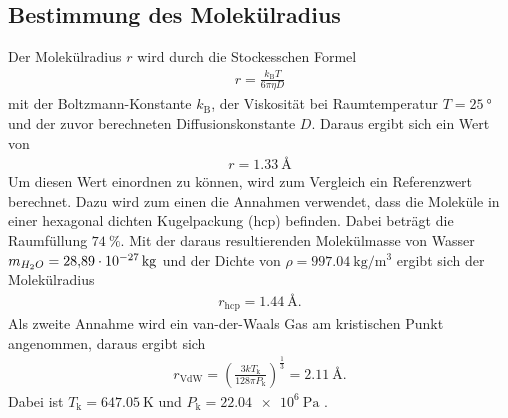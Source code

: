 \subsection{Bestimmung des Molekülradius}
\label{sec:AuswMolekuel}
Der Molekülradius $r$ wird durch die Stockesschen Formel
\begin{align*}
  r = \frac{k_\text{B} T}{6\pi\eta D}
\end{align*}
mit der Boltzmann-Konstante $k_\text{B}$, der Viskosität bei Raumtemperatur $T = \SI{25}{\degree}$
und der zuvor berechneten Diffusionskonstante $D$. Daraus ergibt sich ein Wert von
\begin{align*}
  r = \SI{1.33}{\angstrom}
\end{align*}
Um diesen Wert einordnen zu können, wird zum Vergleich ein Referenzwert berechnet.
Dazu wird zum einen die Annahmen verwendet, dass die Moleküle in einer
hexagonal dichten Kugelpackung (hcp) befinden. Dabei beträgt die Raumfüllung
$\SI{74}{\percent}$. Mit der daraus resultierenden Molekülmasse von Wasser
$m_{H_2O} = \SI{28.89d-27}{\kilo\gram}$ und der Dichte von
$\rho = \SI{997.04}{\kilo\gram\per\cubic\meter}$ \cite{hcp} ergibt sich der
Molekülradius
\begin{align*}
  r_\text{hcp} = \SI{1.44}{\angstrom}.
\end{align*}
Als zweite Annahme wird ein van-der-Waals Gas am kristischen Punkt angenommen,
daraus ergibt sich
\begin{align*}
  r_\text{VdW} = \left(\frac{3kT_\text{k}}{128\pi P_\text{k}}\right)^\frac{1}{3} = \SI{2.11}{\angstrom}.
\end{align*}
Dabei ist $T_\text{k} = \SI{647.05}{\kelvin}$ und $P_\text{k} = \SI{22.04e6}{\pascal}$ \cite{VdW}.





